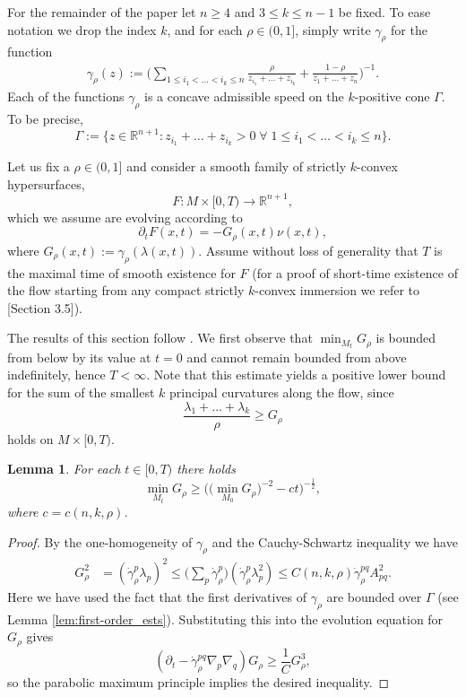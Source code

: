 \documentclass[12pt]{amsart}
\newtheorem{lemma}[theorem]{Lemma}
\begin{document}
For the remainder of the paper let $n\geq 4$ and $3 \leq k \leq n-1$ be fixed. To ease notation we drop the index $k$, and for each $\rho\in(0,1]$, simply write $\gamma_\rho$ for the function 
\begin{align*}
\gamma_\rho(z) := \Bigg(\sum_{1 \leq i_1 < \dots < i_k \leq n} \frac{\rho}{z_{i_1} + \dots + z_{i_k}} + \frac{1-\rho}{z_1 + \dots + z_n} \Bigg)^{-1}.
\end{align*} 
Each of the functions $\gamma_\rho$ is a concave admissible speed on the $k$-positive cone $\Gamma$. To be precise,
\[\Gamma := \{ z \in \mathbb{R}^{n+1} :  z_{i_1} + \dots +z_{i_k} >0 \; \forall \; {1 \leq i_1 < \dots < i_k \leq n} \}.\]

Let us fix a $\rho \in (0,1]$ and consider a smooth family of strictly $k$-convex hypersurfaces,
\[F:M\times[0,T) \to \mathbb{R}^{n+1},\]
which we assume are evolving according to 
\begin{equation}
\label{eq:CF}
\partial_t F(x,t) = - G_\rho(x,t) \nu(x,t),
\end{equation}
where $G_\rho(x,t) := \gamma_\rho(\lambda(x,t)).$ Assume without loss of generality that $T$ is the maximal time of smooth existence for $F$ (for a proof of short-time existence of the flow starting from any compact strictly $k$-convex immersion we refer to \cite{Lang14}[Section 3.5]).

The results of this section follow \cite{And94_euclid}. We first observe that $\min_{M_t} G_\rho$ is bounded from below by its value at $t = 0$ and cannot remain bounded from above indefinitely, hence $T < \infty$. Note that this estimate yields a positive lower bound for the sum of the smallest $k$ principal curvatures along the flow, since 
\[\frac{\lambda_1 + \dots + \lambda_k}{\rho} \geq G_\rho\]
holds on $M\times [0,T)$.

\begin{lemma}
\label{lem:speed_lower}
For each $t \in [0,T)$ there holds 
\[\min_{M_t} G_{\rho} \geq \bigg( \Big(\min_{M_0} G_{\rho}\Big)^{-2} - c t \bigg)^{-\frac{1}{2}},\]
where $c = c(n,k,\rho)$. 
\end{lemma}
\begin{proof}
By the one-homogeneity of $\gamma_{\rho}$ and the Cauchy-Schwartz inequality we have 
\begin{align*}
G_{\rho}^2 &= (\dot \gamma_{\rho}^{p} \lambda_p)^2 \leq \bigg( \sum_p \dot  \gamma_{\rho}^p \bigg)( \dot \gamma_{\rho}^p \lambda_p^2)\leq C(n,k,\rho) \dot \gamma_{\rho}^{pq} A^2_{pq}.
\end{align*}
Here we have used the fact that the first derivatives of $\gamma_\rho$ are bounded over $\Gamma$ (see Lemma \ref{lem:first-order_ests}). Substituting this into the evolution equation for $G_{\rho}$ gives 
\[(\partial_t-\dot \gamma^{pq}_\rho \nabla_p \nabla_q )  G_{\rho} \geq \frac{1}{C} G_{\rho}^3,\]
so the parabolic maximum principle implies the desired inequality.
\end{proof}
\end{document}
